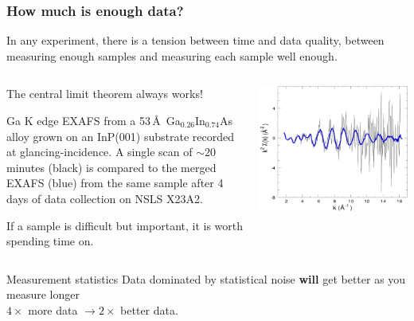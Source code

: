 \documentclass[10pt, xcolor=x11names, compress]{beamer}
\begin{document}
\begin{frame}
  \frametitle{How much is enough data?} 

  In any experiment, there is a tension between time and data quality,
  between measuring enough samples and measuring each sample well
  enough.

  \bigskip

  \begin{columns}
    \begin{column}{0.6\linewidth}
      \small
      The central limit theorem \alert{always} works!

      \smallskip
      
      Ga K edge EXAFS from a 53\,\AA\ Ga$_{0.26}$In$_{0.74}$As alloy
      grown on an InP(001) substrate recorded at glancing-incidence.
      A single scan of $\sim20$ minutes (black) is compared to the
      merged EXAFS (blue) from the same sample after 4 days of data
      collection on NSLS X23A2.

      \smallskip
      
      If a sample is difficult but important, it is worth spending
      time on.
    \end{column}
    \begin{column}{0.4\linewidth}
      \includegraphics[width=\linewidth]{exp/centrallimit.png}\\
    \end{column}
  \end{columns}

  \begin{block}{Measurement statistics}
    \small
    Data dominated by \alert{statistical} noise \textbf{will} get
    better as you measure longer\\$4\times$ more data $\rightarrow
    2\times$ better data.


\end{block}
\end{frame}
\end{document}

